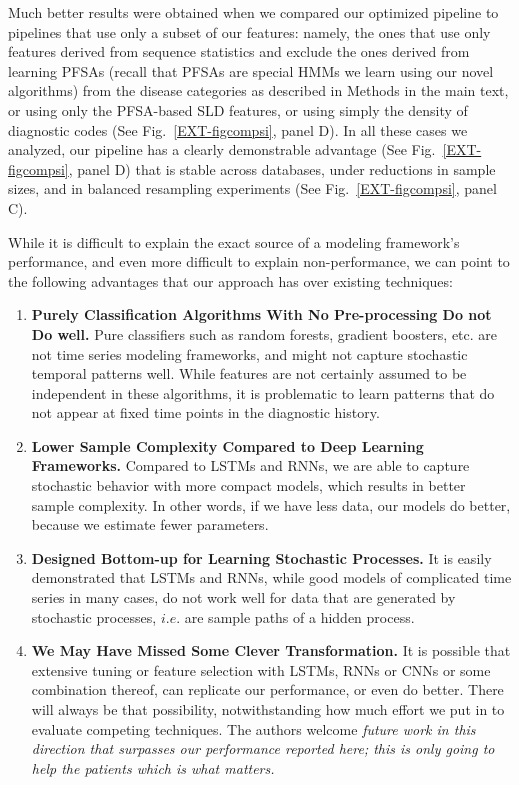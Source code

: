 \documentclass[3p,super,numbers,sort&compress,preprint,10pt]{elsarticle}
\begin{document}
  Much better results were obtained when we compared our optimized pipeline to pipelines that use only a subset of our features: namely, the  ones that use only features derived from sequence statistics and exclude the ones derived from learning PFSAs (recall that PFSAs are special HMMs we learn using our novel algorithms)  from the disease categories as described in Methods in the main text, or using only the PFSA-based SLD features, or using simply the density of diagnostic codes (See Fig.~\ref{EXT-figcompsi}, panel D). In all these cases we analyzed, our pipeline has a clearly demonstrable advantage (See  Fig.~\ref{EXT-figcompsi}, panel D) that is stable across databases,  under reductions in sample sizes, and in balanced resampling experiments (See Fig.~\ref{EXT-figcompsi}, panel C).
  
  While it is difficult to explain the exact source of a modeling framework's performance, and even more difficult to explain  non-performance, we can point to the following advantages that our approach has over existing techniques:
  \begin{enumerate}
    \item \textbf{Purely Classification Algorithms With No Pre-processing Do not Do well.} Pure classifiers such as random forests, gradient boosters, etc. are not time series modeling frameworks, and might not capture stochastic temporal patterns well. While features are not certainly assumed to be independent in these algorithms, it is problematic to learn patterns that do not appear at fixed time points in the diagnostic history.
  \item \textbf{Lower Sample Complexity Compared to Deep Learning Frameworks.} Compared to LSTMs and RNNs, we are able to capture stochastic behavior with more compact models, which results in  better sample complexity. In other words, if we have less data, our models do better, because we estimate fewer parameters.
  \item \textbf{Designed Bottom-up for Learning Stochastic Processes.} It is easily demonstrated that LSTMs and RNNs, while good models of complicated time series in many cases, do not work well for data that are generated by stochastic processes, $i.e.$ are sample paths of a hidden process.
    \item \textbf{We May Have  Missed Some Clever Transformation.} It is possible that extensive tuning or feature selection with LSTMs, RNNs or CNNs or some combination thereof, can replicate our performance, or even do better. There will always be that possibility, notwithstanding how much effort we put in to evaluate competing techniques. The authors welcome  \textit{future work in this direction that surpasses our  performance reported here; this  is only going to help the patients  which is what  matters.}
  \end{enumerate}
%
\end{document}
